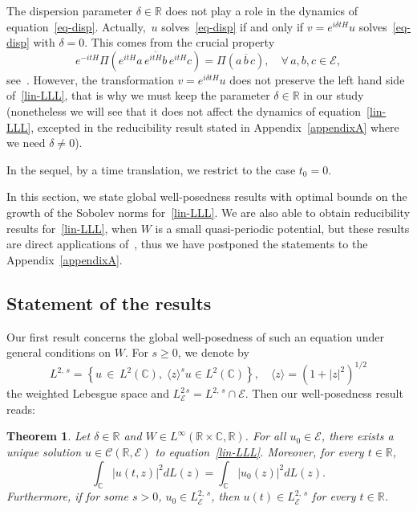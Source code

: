 \documentclass[10pt]{amsart}
\newtheorem{theo}{Theorem}[section]
\theoremstyle{definition}\newtheorem{defi}[theo]{Definition}\newtheorem{rema}[theo]{Remark}\newtheorem{exam}[theo]{Example}\newtheorem{exem}[theo]{Example}\newtheorem{nota}[theo]{Notation}
\newcommand{\C}{\mathbb{C}}
\newcommand{\R}{\mathbb{R}}
\newcommand{\E}{\mathcal{E}}
\newcommand{\clC}{\mathcal{C}}
\newcommand{\ov}{\overline}
\newcommand{\<}{\langle}
\renewcommand{\>}{\rangle}
\let\oldforall\forall
\renewcommand*{\forall}{\mathrel{\oldforall}}
\begin{document}
The dispersion parameter $\delta \in \R$ does not play a role in the dynamics of equation~\eqref{eq-disp}. Actually,~$u$ solves~\eqref{eq-disp} if and only if $v=e^{i \delta t H}u$ solves~\eqref{eq-disp} with $\delta=0$. This comes from the crucial property
\[
e^{-itH}\Pi\left(e^{itH} a\, \ov{e^{itH} b}\, e^{itH} c\right)= \Pi\left(a\, \ov{b}\, c\right), \quad \forall \,a,b,c \in \E,
\]
see~\cite[Lemma~2.4 and Corollary~2.5]{GHT1}. However, the transformation $v=e^{i \delta t H}u$ does not preserve the left hand side of~\eqref{lin-LLL}, that is why we must keep the parameter $\delta \in \R$ in our study (nonetheless we will see that it does not affect the dynamics of equation~\eqref{lin-LLL}, excepted in the reducibility result stated in Appendix~\ref{appendixA} where we need $\delta \neq 0$).

In the sequel, by a time translation, we restrict to the case $t_0=0$.

In this section, we state global well-posedness results with optimal bounds on the growth of the Sobolev norms for~\eqref{lin-LLL}. We are also able to obtain reducibility results for~\eqref{lin-LLL}, when $W$ is a small quasi-periodic potential, but these results are direct applications of~\cite{Grebert-Thomann}, thus we have postponed the statements to the Appendix~\ref{appendixA}.

\subsection{Statement of the results}
Our first result concerns the global well-posedness of such an equation under general conditions on $W$. For $s\geq 0$, we denote by
\begin{equation}\label{defl2}
L^{2,\,s}=\left\{u\,\in\,L^2(\C), \;\<z\>^su \in L^2(\C)\right\}, \quad \<z\>=\left(1+|z|^2\right)^{1/2}
\end{equation}
the weighted Lebesgue space and $L^{2\,s}_{\E}=L^{2,\,s} \cap \E$. Then our well-posedness result reads:

\begin{theo}\label{thm2.1}
Let $\delta \in \R$ and $W\in L^{\infty}(\R\times \C,\R)$. For all $u_0 \in \E$, there exists a unique solution $u\in \clC (\R,
\E)$ to equation~\eqref{lin-LLL}. Moreover, for every $t\in \R$,
\[
\int_{\C}\left|u(t,z)\right|^2dL(z)=\int_{\C}\left|u_0(z)\right|^2dL(z).
\]
Furthermore, if for some $s>0$, $u_0 \in L^{2,\,s}_\E$, then $u(t) \in L^{2,\,s}_\E$ for every $t\in \R$.
\end{theo}
\end{document}
